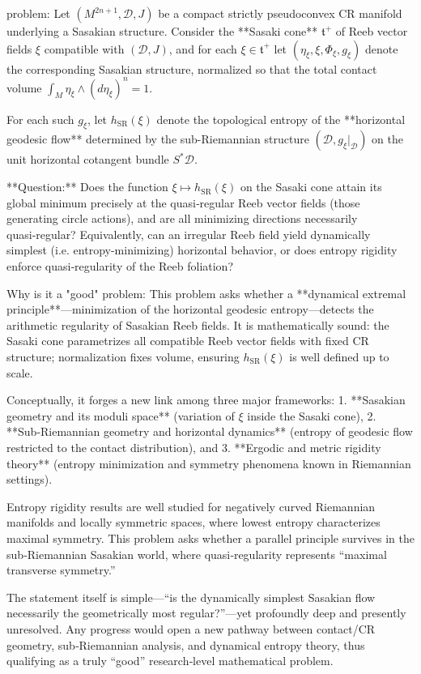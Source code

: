 problem:  
Let \((M^{2n+1}, \mathcal{D}, J)\) be a compact strictly pseudoconvex CR manifold underlying a Sasakian structure. Consider the **Sasaki cone** \(\mathfrak{t}^+\) of Reeb vector fields \(\xi\) compatible with \((\mathcal{D}, J)\), and for each \(\xi \in \mathfrak{t}^+\) let \((\eta_\xi, \xi, \Phi_\xi, g_\xi)\) denote the corresponding Sasakian structure, normalized so that the total contact volume \(\int_M \eta_\xi \wedge (d\eta_\xi)^n = 1\).  

For each such \(g_\xi\), let \(h_{\mathrm{SR}}(\xi)\) denote the topological entropy of the **horizontal geodesic flow** determined by the sub-Riemannian structure \((\mathcal{D}, g_\xi|_{\mathcal{D}})\) on the unit horizontal cotangent bundle \(S^*\mathcal{D}\).

**Question:**  
Does the function \(\xi \mapsto h_{\mathrm{SR}}(\xi)\) on the Sasaki cone attain its global minimum precisely at the quasi‑regular Reeb vector fields (those generating circle actions), and are all minimizing directions necessarily quasi‑regular?  
Equivalently, can an irregular Reeb field yield dynamically simplest (i.e. entropy-minimizing) horizontal behavior, or does entropy rigidity enforce quasi‑regularity of the Reeb foliation?

Why is it a "good" problem:  
This problem asks whether a **dynamical extremal principle**—minimization of the horizontal geodesic entropy—detects the arithmetic regularity of Sasakian Reeb fields. It is mathematically sound: the Sasaki cone parametrizes all compatible Reeb vector fields with fixed CR structure; normalization fixes volume, ensuring \(h_{\mathrm{SR}}(\xi)\) is well defined up to scale.  

Conceptually, it forges a new link among three major frameworks:
1. **Sasakian geometry and its moduli space** (variation of \(\xi\) inside the Sasaki cone),  
2. **Sub‑Riemannian geometry and horizontal dynamics** (entropy of geodesic flow restricted to the contact distribution), and  
3. **Ergodic and metric rigidity theory** (entropy minimization and symmetry phenomena known in Riemannian settings).

Entropy rigidity results are well studied for negatively curved Riemannian manifolds and locally symmetric spaces, where lowest entropy characterizes maximal symmetry. This problem asks whether a parallel principle survives in the sub‑Riemannian Sasakian world, where quasi‑regularity represents “maximal transverse symmetry.”  

The statement itself is simple—“is the dynamically simplest Sasakian flow necessarily the geometrically most regular?”—yet profoundly deep and presently unresolved. Any progress would open a new pathway between contact/CR geometry, sub‑Riemannian analysis, and dynamical entropy theory, thus qualifying as a truly “good” research‑level mathematical problem.